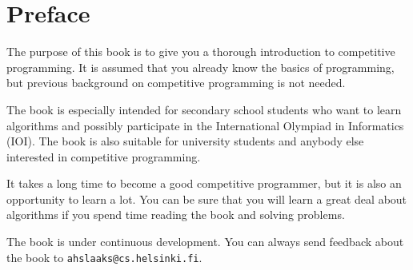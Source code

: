 \chapter*{Preface}

The purpose of this book is to give you
a thorough introduction to competitive programming.
It is assumed that you already
know the basics of programming, but previous
background on competitive programming is not needed.

The book is especially intended for
secondary school students who want to learn
algorithms and possibly participate in
the International Olympiad in Informatics (IOI).
The book is also suitable for university students
and anybody else interested in competitive programming.

It takes a long time to become a good competitive
programmer, but it is also an opportunity to learn a lot.
You can be sure that you will learn a great deal
about algorithms if you spend time reading the book
and solving problems.

The book is under continuous development.
You can always send feedback about the book to
\texttt{ahslaaks@cs.helsinki.fi}.
